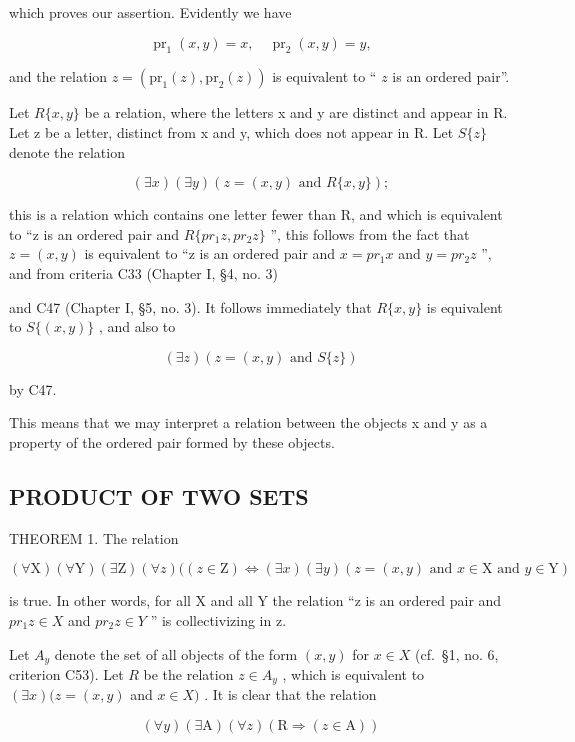 which proves our assertion. Evidently we have

\[
\operatorname{pr} _ {1} (x, y) = x, \quad \operatorname{pr} _ {2} (x, y) = y,
\]

and the relation \(z = (\mathrm{pr}_1(z), \mathrm{pr}_2(z))\) is equivalent to `` \(z\) is an ordered pair''.

Let \(R\{x, y\}\) be a relation, where the letters x and y are distinct and appear in R. Let z be a letter, distinct from x and y, which does not appear in R. Let \(S\{z\}\) denote the relation

\[
(\exists x) (\exists y) (z = (x, y) \text {   and   } R \{x, y \});
\]

this is a relation which contains one letter fewer than R, and which is equivalent to ``z is an ordered pair and \(R\{pr_{1}z, pr_{2}z\}\) '', this follows from the fact that \(z = (x, y)\) is equivalent to ``z is an ordered pair and \(x = pr_{1}x\) and \(y = pr_{2}z\) '', and from criteria C33 (Chapter I, §4, no. 3)

and C47 (Chapter I, §5, no. 3). It follows immediately that \(R\{x, y\}\) is equivalent to \(S\{(x, y)\}\) , and also to

\[
(\exists z) (z = (x, y) \text {   and   } S \{z \})
\]

by C47.

This means that we may interpret a relation between the objects x and y as a property of the ordered pair formed by these objects.

\subsection{PRODUCT OF TWO SETS}

THEOREM 1. The relation

\[
(\forall \mathrm{X}) (\forall \mathrm{Y}) (\exists \mathrm{Z}) (\forall z) ((z \in \mathrm{Z}) \iff (\exists x) (\exists y) (z = (x, y) \text {   and   } x \in \mathrm{X} \text {   and   } y \in \mathrm{Y})
\]

is true. In other words, for all X and all Y the relation ``z is an ordered pair and \(pr_{1}z \in X\) and \(pr_{2}z \in Y\) '' is collectivizing in z.

Let \(A_y\) denote the set of all objects of the form \((x, y)\) for \(x \in X\) (cf.~§1, no. 6, criterion C53). Let \(R\) be the relation \(z \in A_y\) , which is equivalent to \((\exists x)(z = (x, y)\) and \(x \in X)\) . It is clear that the relation

\[
(\forall y) (\exists \mathrm{A}) (\forall z) (\mathrm{R} \Longrightarrow (z \in \mathrm{A}))
\]

